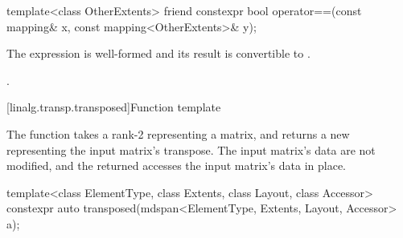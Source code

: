 %
\begin{itemdecl}
template<class OtherExtents>
  friend constexpr bool operator==(const mapping& x, const mapping<OtherExtents>& y);
\end{itemdecl}

\begin{itemdescr}
\pnum
\constraints
The expression
is well-formed and its result is convertible to .

\pnum
\returns
{}.
\end{itemdescr}

[linalg.transp.transposed]{Function template }

\pnum
The  function
takes a rank-2  representing a matrix, and
returns a new  representing the input matrix's transpose.
The input matrix's data are not modified, and
the returned  accesses the input matrix's data in place.
%
\begin{itemdecl}
  template<class ElementType, class Extents, class Layout, class Accessor>
    constexpr auto transposed(mdspan<ElementType, Extents, Layout, Accessor> a);
\end{itemdecl}

